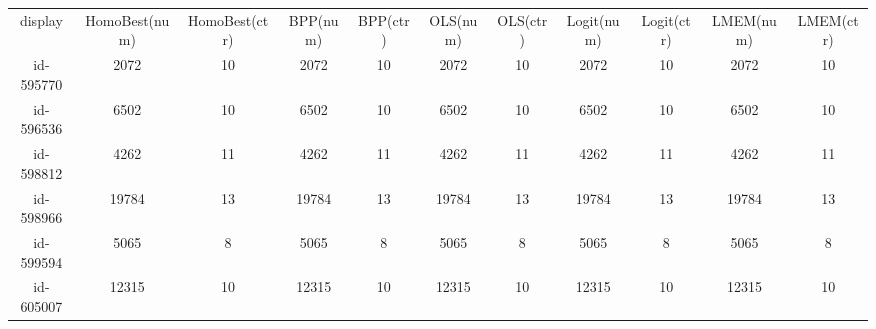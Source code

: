 \begin{tabular}{ccccccccccc}
display & HomoBest(num) & HomoBest(ctr) & BPP(num) & BPP(ctr) & OLS(num) & OLS(ctr) & Logit(num) & Logit(ctr) & LMEM(num) & LMEM(ctr)\\
id-595770 & 2072 & 10 & 2072 & 10 & 2072 & 10 & 2072 & 10 & 2072 & 10\\
id-596536 & 6502 & 10 & 6502 & 10 & 6502 & 10 & 6502 & 10 & 6502 & 10\\
id-598812 & 4262 & 11 & 4262 & 11 & 4262 & 11 & 4262 & 11 & 4262 & 11\\
id-598966 & 19784 & 13 & 19784 & 13 & 19784 & 13 & 19784 & 13 & 19784 & 13\\
id-599594 & 5065 & 8 & 5065 & 8 & 5065 & 8 & 5065 & 8 & 5065 & 8\\
id-605007 & 12315 & 10 & 12315 & 10 & 12315 & 10 & 12315 & 10 & 12315 & 10\\
\end{tabular}
